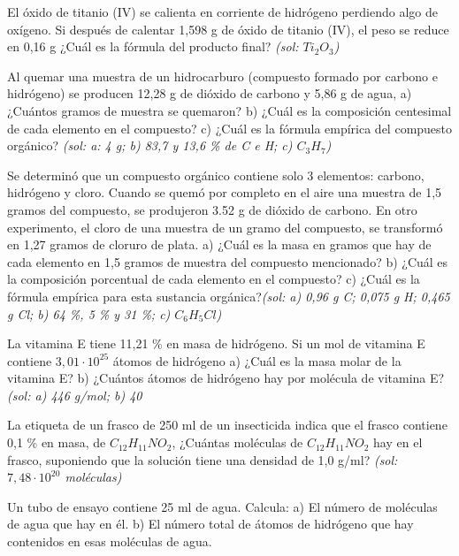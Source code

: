 \begin{multicols}{2}
\begin{problem}
El óxido de titanio (IV) se calienta en corriente de hidrógeno perdiendo algo de oxígeno. Si después de calentar 1,598 g de óxido de titanio (IV), el peso se reduce en 0,16 g ¿Cuál es la fórmula del producto final?	\textit{\scriptsize(sol: $Ti_2O_3$)}
\end{problem}
\begin{problem}
Al quemar una muestra de un hidrocarburo (compuesto formado por carbono e hidrógeno) se producen 12,28 g de dióxido de carbono y 5,86 g de agua, a) ¿Cuántos gramos de muestra se quemaron? b) ¿Cuál es la composición centesimal de cada elemento en el compuesto? c) ¿Cuál es la fórmula empírica del compuesto orgánico? \textit{\scriptsize(sol: a: 4 g; b) 83,7 y 13,6 \% de C e H; c)  $C_3H_7$)}
\end{problem}
\begin{problem}
Se determinó que un compuesto orgánico contiene solo 3 elementos: carbono, hidrógeno y cloro. Cuando se quemó por completo en el aire una muestra de 1,5 gramos del compuesto, se produjeron 3.52 g de dióxido de carbono. En otro experimento, el cloro de una muestra de un gramo del compuesto, se transformó en 1,27 gramos de cloruro de plata.
a)	¿Cuál es la masa en gramos que hay de cada elemento en 1,5 gramos de muestra del compuesto mencionado?
b)	¿Cuál es la composición porcentual de cada elemento en el compuesto?
c)	¿Cuál es la fórmula empírica para esta sustancia orgánica?\textit{\scriptsize(sol: a) 0,96 g C; 0,075 g H; 0,465 g Cl; b) 64 \%, 5 \% y 31 \%; c) $C_6H_5Cl$)}
\end{problem}
\begin{problem}
La vitamina E tiene 11,21 \% en masa de hidrógeno. Si un mol de vitamina E contiene $3,01\cdot10^{25}$ átomos de hidrógeno
a)	¿Cuál es la masa molar de la vitamina E?
b)	¿Cuántos átomos de hidrógeno hay por molécula de vitamina E? \textit{\scriptsize(sol: a) 446 g/mol; b) 40}	
\end{problem}
\begin{problem}
La etiqueta de un frasco de 250 ml de un insecticida indica que el frasco contiene 0,1 \% en masa, de $C_{12}H_{11}NO_2$, ¿Cuántas moléculas de $C_{12}H_{11}NO_2$ hay en el frasco, suponiendo que la solución tiene una densidad de 1,0 g/ml? \textit{\scriptsize(sol: $7,48\cdot 10^{20}$ moléculas)} 
\end{problem}
\begin{problem}
Un tubo de ensayo contiene 25 ml de agua. Calcula:
a)	El número de moléculas de agua que hay en él.
b)	El número total de átomos de hidrógeno que hay contenidos en esas moléculas de agua.

\end{problem}
\end{multicols}
